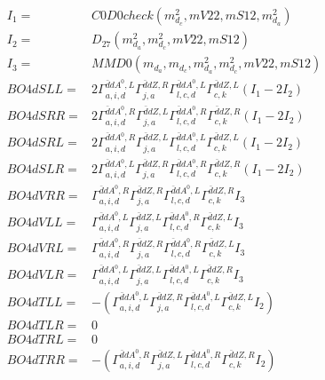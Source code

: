 \documentclass[A4,landscape]{article}
\begin{document}
\begin{align} 
I_1 = & C0D0check(m^2_{d_{{c}}}, mV22, mS12, m^2_{d_{{a}}}) \\ 
I_2 = & D_{27}(m^2_{d_{{a}}}, m^2_{d_{{c}}}, mV22, mS12) \\ 
I_3 = & MMD0(m_{d_{{a}}}, m_{d_{{c}}}, m^2_{d_{{a}}}, m^2_{d_{{c}}}, mV22, mS12) \\ 
  BO4dSLL= & 2  \Gamma^{\bar{d}d A^0 ,L}_{a, i, d} \Gamma^{\bar{d}d Z ,R}_{j, a} \Gamma^{\bar{d}d A^0 ,L}_{l, c, d} \Gamma^{\bar{d}d Z ,L}_{c, k} (I_1 - 2 I_2) \\ 
  BO4dSRR= & 2  \Gamma^{\bar{d}d A^0 ,R}_{a, i, d} \Gamma^{\bar{d}d Z ,L}_{j, a} \Gamma^{\bar{d}d A^0 ,R}_{l, c, d} \Gamma^{\bar{d}d Z ,R}_{c, k} (I_1 - 2 I_2) \\ 
  BO4dSRL= & 2  \Gamma^{\bar{d}d A^0 ,R}_{a, i, d} \Gamma^{\bar{d}d Z ,L}_{j, a} \Gamma^{\bar{d}d A^0 ,L}_{l, c, d} \Gamma^{\bar{d}d Z ,L}_{c, k} (I_1 - 2 I_2) \\ 
  BO4dSLR= & 2  \Gamma^{\bar{d}d A^0 ,L}_{a, i, d} \Gamma^{\bar{d}d Z ,R}_{j, a} \Gamma^{\bar{d}d A^0 ,R}_{l, c, d} \Gamma^{\bar{d}d Z ,R}_{c, k} (I_1 - 2 I_2) \\ 
  BO4dVRR= &  \Gamma^{\bar{d}d A^0 ,R}_{a, i, d} \Gamma^{\bar{d}d Z ,R}_{j, a} \Gamma^{\bar{d}d A^0 ,L}_{l, c, d} \Gamma^{\bar{d}d Z ,R}_{c, k} I_3 \\ 
  BO4dVLL= &  \Gamma^{\bar{d}d A^0 ,L}_{a, i, d} \Gamma^{\bar{d}d Z ,L}_{j, a} \Gamma^{\bar{d}d A^0 ,R}_{l, c, d} \Gamma^{\bar{d}d Z ,L}_{c, k} I_3 \\ 
  BO4dVRL= &  \Gamma^{\bar{d}d A^0 ,R}_{a, i, d} \Gamma^{\bar{d}d Z ,R}_{j, a} \Gamma^{\bar{d}d A^0 ,R}_{l, c, d} \Gamma^{\bar{d}d Z ,L}_{c, k} I_3 \\ 
  BO4dVLR= &  \Gamma^{\bar{d}d A^0 ,L}_{a, i, d} \Gamma^{\bar{d}d Z ,L}_{j, a} \Gamma^{\bar{d}d A^0 ,L}_{l, c, d} \Gamma^{\bar{d}d Z ,R}_{c, k} I_3 \\ 
  BO4dTLL= & -( \Gamma^{\bar{d}d A^0 ,L}_{a, i, d} \Gamma^{\bar{d}d Z ,R}_{j, a} \Gamma^{\bar{d}d A^0 ,L}_{l, c, d} \Gamma^{\bar{d}d Z ,L}_{c, k} I_2) \\ 
  BO4dTLR= & 0 \\ 
  BO4dTRL= & 0 \\ 
  BO4dTRR= & -( \Gamma^{\bar{d}d A^0 ,R}_{a, i, d} \Gamma^{\bar{d}d Z ,L}_{j, a} \Gamma^{\bar{d}d A^0 ,R}_{l, c, d} \Gamma^{\bar{d}d Z ,R}_{c, k} I_2) \\ 
\end{align} 
\end{document}
